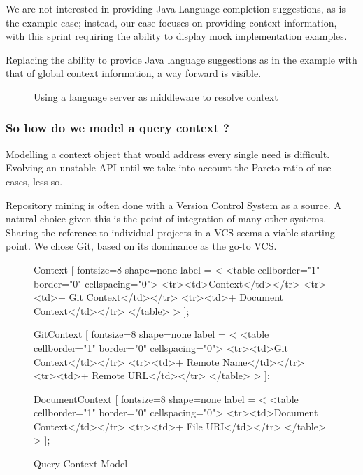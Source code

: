 We are not interested in providing Java Language completion suggestions, as is the example case; instead, our case focuses on providing context information, with this sprint requiring the ability to display mock implementation examples.

Replacing the ability to provide Java language suggestions as in the example with that of global context information, a way forward is visible.

\begin{figure}[h!]
	
\caption{Using a language server as middleware to resolve context}
\end{figure}


\subsubsection{So how do we model a query context ?}

Modelling a context object that would address every single need is difficult. Evolving an unstable API until we take into account the Pareto ratio of use cases, less so. 

Repository mining is often done with a Version Control System as a source. A natural choice given this is the point of integration of many other systems. Sharing the reference to individual projects in a VCS seems a viable starting  point. We chose Git, based on its dominance as the go-to VCS.


\begin{figure}[h!]
{\centering
	 {	     
		     Context [
		     	fontsize=8
		     	shape=none
		     	label = <
		     		<table cellborder="1" border="0" cellspacing="0">
		     		<tr><td>Context</td></tr>
		     		<tr><td>+ Git Context</td></tr>
		     		<tr><td>+ Document Context</td></tr>	     		
		     		</table>
		     	>
		     ];
		     
		     GitContext [
		     fontsize=8
		     shape=none
		     label = <
			     <table cellborder="1" border="0" cellspacing="0">
			     <tr><td>Git Context</td></tr>
			     <tr><td>+ Remote Name</td></tr>
			     <tr><td>+ Remote URL</td></tr>	     		
			     </table>
		     >
		     ];
		     
		     DocumentContext [
		     fontsize=8
		     shape=none
		     label = <
			     <table cellborder="1" border="0" cellspacing="0">
			     <tr><td>Document Context</td></tr>
			     <tr><td>+ File URI</td></tr>  		
			     </table>
		     >
		     ];
			
	}
	\caption{Query Context Model}
}

\end{figure}

